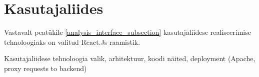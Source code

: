 \section{Kasutajaliides}
Vastavalt peatükile \ref{analysis_interface_subsection} kasutajaliidese realiseerimise tehnoloogiaks
on valitud React.Js raamistik.


Kasutajaliidese tehnoloogia valik, arhitektuur, koodi näited, deployment (Apache, proxy requests to backend)




